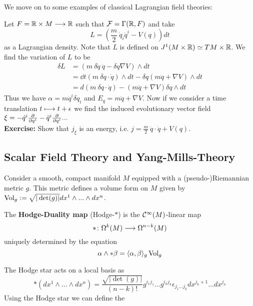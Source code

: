 We move on to some examples of classical Lagrangian field theories:

\begin{example}
  Let $F= \mathbb{R} \times M \longrightarrow \mathbb{R}$ such that ${\mathcal{F}} = \Gamma(\mathbb{R}, F)$ and take
  $$L = \left(\frac{m}{2} \ \dot q_i \dot q^i - V(q) \right) dt$$
  as a Lagrangian density. Note that $L$ is defined on $J^1(M \times \mathbb{R}) \simeq TM \times \mathbb{R}$. We find the variation of $L$ to be
  \begin{align*}
    \delta L &= \left( m \ \delta \dot q \ \dot q - \delta q \nabla V \right) \wedge dt \\
    &= \dd{}{t} \left( m \ \delta q \cdot \dot q \right) \wedge dt - \delta q \left( m \ddot q + \nabla V \right) \wedge dt\\
    &= d \left( m \ \delta q \cdot \dot q \right) - \left( m \ddot q + \nabla V \right) \delta q \wedge dt
  \end{align*}
  Thus we have $\alpha = m \dot q^i \delta q_i$ and $E_q = m \ddot q + \nabla V$. Now if we consider a time translation $t \lmap t + \epsilon$ we find the induced evolutionary vector field $\xi = - \dot q^i \frac{\partial }{\partial q^i} - \ddot q^i \frac{\partial }{\partial q^i} ...$\\
  \textbf{Exercise:} Show that $j_\xi$ is an energy, i.e. $j = \frac{m}{2} \ \dot q \cdot \dot q + V(q)$.
\end{example}

\newpage
\subsection{Scalar Field Theory and Yang-Mills-Theory}

Consider a smooth, compact manifold $M$ equipped with a (pseudo-)Riemannian metric $g$. This metric defines a volume form on $M$ given by $\operatorname{Vol}_g := \sqrt{|\det(g)|} dx^1 \wedge ... \wedge dx^n$.

\begin{definition}
  The \textbf{Hodge-Duality map} (Hodge-$*$) is the $\mathcal{C}^{\infty}(M)$-linear map
  $$ * \colon \Omega^k(M) \longrightarrow \Omega^{n-k}(M) $$
  uniquely determined by the equation
  $$ \alpha \wedge * \beta = \langle \alpha, \beta \rangle_g \operatorname{Vol}_g $$
\end{definition}

The Hodge star acts on a local basis as
$$ *(dx^1\wedge ... \wedge dx^n) = \frac{\sqrt{|\det(g)|}}{(n-k)!} g^{i_1 j_1} ... g^{i_k j_k} \epsilon_{j_1 ... j_k} dx^{j_k+1} ... dx^{j_n} $$
Using the Hodge star we can define the

